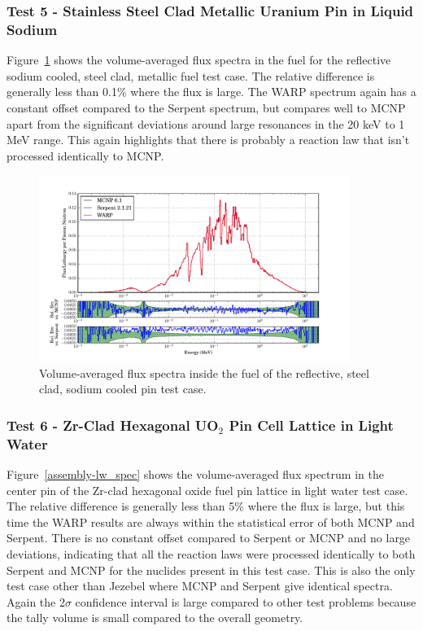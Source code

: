 \documentclass[preprint,12pt]{elsarticle}
\begin{document}
\newpage
\subsubsection{Test 5 - Stainless Steel Clad Metallic Uranium Pin in Liquid Sodium}

Figure~\ref{sodiumpin_spec} shows the volume-averaged flux spectra in the fuel for the reflective sodium cooled, steel clad, metallic fuel test case.  The relative difference is generally less than 0.1\% where the flux is large.  The WARP spectrum again has a constant offset compared to the Serpent spectrum, but compares well to MCNP apart from the significant deviations around large resonances in the 20 keV to 1 MeV range.  This again highlights that there is probably a reaction law that isn't processed identically to MCNP.

\begin{figure}[h!]
\centering
\includegraphics[width=0.9\textwidth,trim= 1cm 0cm 1cm 0cm]{graphics/sodiumpin_spec.pdf}
\caption{Volume-averaged flux spectra inside the fuel of the reflective, steel clad, sodium cooled pin test case. \label{sodiumpin_spec} }
\end{figure}


\newpage
\subsubsection{Test 6 - Zr-Clad Hexagonal UO$_2$ Pin Cell Lattice in Light Water}

Figure~\ref{assembly-lw_spec} shows the volume-averaged flux spectrum in the center pin of the Zr-clad hexagonal oxide fuel pin lattice in light water test case. The relative difference is generally less than 5\% where the flux is large, but this time the WARP results are always within the statistical error of both MCNP and Serpent.  There is no constant offset compared to Serpent or MCNP and no large deviations, indicating that all the reaction laws were processed identically to both Serpent and MCNP for the nuclides present in this test case.  This is also the only test case other than Jezebel where MCNP and Serpent give identical spectra.  Again the 2$\sigma$ confidence interval is large compared to other test problems because the tally volume is small compared to the overall geometry.
\end{document}
